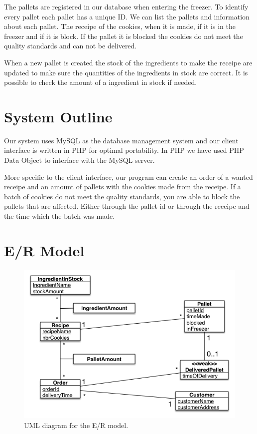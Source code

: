 \documentclass[a4paper]{article}
\begin{document}
The pallets are registered in our database when entering the freezer. To identify every pallet each pallet has a unique ID. We can list the pallets and information about each pallet. The receipe of the cookies, when it is made, if it is in the freezer and if it is block. If the pallet it is blocked the cookies do not meet the quality standards and can not be delivered.

When a new pallet is created the stock of the ingredients to make the receipe are updated to make sure the quantities of the ingredients in stock are correct. It is possible to check the amount of a ingredient in stock if needed.
%
%
%

\section{System Outline}
Our system uses MySQL as the database management system and our client interface is written in PHP for optimal portability. In PHP we have used PHP Data Object to interface with the MySQL server.


More specific to the client interface, our program can create an order of a wanted receipe and an amount of pallets with the cookies made from the receipe. If a batch of cookies do not meet the quality standards, you are able to block the pallets that are affected. Either through the pallet id or through the receipe and the time which the batch was made. 

\begin{description}
\item{}
\end{description}
\section{E/R Model}
\begin{figure}[!h]
\centering
\includegraphics[scale=0.7]{projectUMLFinal.png}
\caption{UML diagram for the E/R model.}
\label{uml}
\end{figure}
\end{document}
